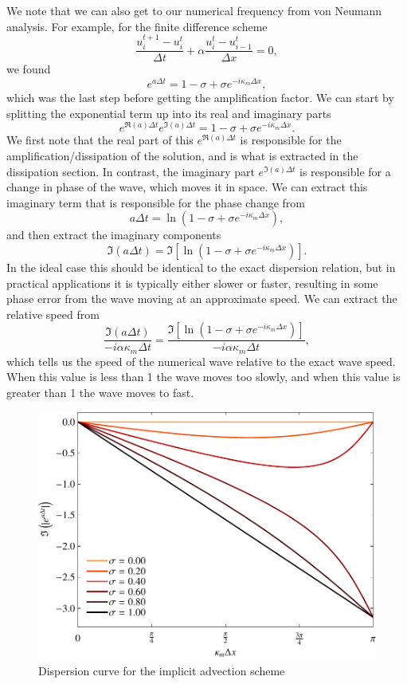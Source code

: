 We note that we can also get to our numerical frequency from von Neumann analysis. For example, for the finite difference scheme
\begin{equation}
	\frac{u_i^{t+1} - u_{i}^t}{\Delta t} +  \alpha \frac{u_i^t - u_{i-1}^t}{\Delta x} = 0,
\end{equation}
we found
\begin{equation}
	e^{a\Delta t} = 1 - \sigma + \sigma e^{-i \kappa_m \Delta x},
\end{equation} 
which was the last step before getting the amplification factor. We can start by splitting the exponential term up into its real and imaginary parts
\begin{equation}
	e^{\Re{(a)}\Delta t} e^{\Im{(a)}\Delta t} = 1 - \sigma + \sigma e^{-i \kappa_m \Delta x}.
\end{equation} 
We first note that the real part of this $e^{\Re{(a)}\Delta t}$ is responsible for the amplification/dissipation of the solution, and is what is extracted in the dissipation section. In contrast, the imaginary part $e^{\Im{(a)}\Delta t}$ is responsible for a change in phase of the wave, which moves it in space. We can extract this imaginary term that is responsible for the phase change from
\begin{equation}
	a\Delta t = \ln \left(1 - \sigma + \sigma e^{-i \kappa_m \Delta x} \right),
\end{equation} 
and then extract the imaginary components
\begin{equation}
	\Im(a\Delta t) = \Im{ \left[ \ln \left(1 - \sigma + \sigma e^{-i \kappa_m \Delta x} \right) \right]}.
\end{equation}
In the ideal case this should be identical to the exact dispersion relation, but in practical applications it is typically either slower or faster, resulting in some phase error from the wave moving at an approximate speed. We can extract the relative speed from
\begin{equation}
	\frac{\Im(a\Delta t)}{-i \alpha \kappa_m \Delta t} = \frac{\Im{ \left[ \ln \left(1 - \sigma + \sigma e^{-i \kappa_m \Delta x} \right) \right]}}{-i \alpha \kappa_m \Delta t},
\end{equation}
which tells us the speed of the numerical wave relative to the exact wave speed. When this value is less than 1 the wave moves too slowly, and when this value is greater than 1 the wave moves to fast.
\begin{figure}[htbp]
	\centering
	\includegraphics[width=0.6\linewidth]{Pictures/ch13_dispersion_adv_explct}
	\caption{Dispersion curve for the implicit advection scheme}
	\label{fig:dissipation_advection_implicit}
\end{figure}

